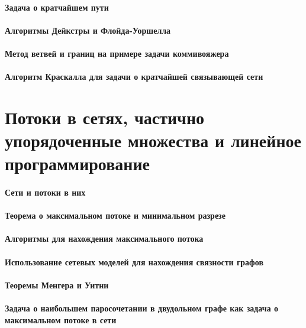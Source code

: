 \documentclass[russian,twocolumn]{article}
\begin{document}
\paragraph{Задача о кратчайшем пути}

\paragraph{Алгоритмы Дейкстры и Флойда-Уоршелла}

\paragraph{Метод ветвей и границ на примере задачи коммивояжера}

\paragraph{Алгоритм Краскалла для задачи о кратчайшей связывающей сети}

\section{Потоки в сетях, частично упорядоченные множества и линейное программирование}

\paragraph{Сети и потоки в них}

\paragraph{Теорема о максимальном потоке и минимальном разрезе}

\paragraph{Алгоритмы для нахождения максимального потока}

\paragraph{Использование сетевых моделей для нахождения связности графов}

\paragraph{Теоремы Менгера и Уитни}

\paragraph{Задача о наибольшем паросочетании в двудольном графе как задача о максимальном потоке в сети}
\end{document}
